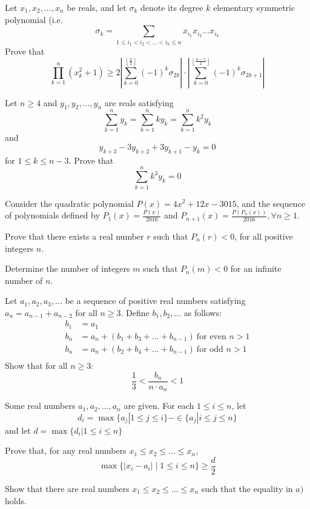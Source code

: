  {Let $x_1,x_2,...,x_n$ be reals, and let $\sigma_k$ denote its degree $k$ elementary symmetric polynomial (i.e. $$\sigma_k=\sum_{1\le i_1<i_2<...<i_k\le n} x_{i_1}x_{i_2}...x_{i_k}$$
Prove that $$\prod_{k=1}^n (x_k^2+1) \ge 2\left\lvert \sum_{k=0}^{\left\lfloor \frac{n}{2}\right\rfloor} (-1)^k\sigma_{2k} \right\rvert\cdot \left\lvert \sum_{k=0}^{\left\lfloor \frac{n-1}{2}\right\rfloor} (-1)^k\sigma_{2k+1} \right\rvert$$}



 {Let $n\ge 4$ and $y_1,y_2,...,y_n$ are reals satisfying $$\sum_{k=1}^n y_k=\sum_{k=1}^n ky_k = \sum_{k=1}^n k^2y_k$$ and $$y_{k+3}-3y_{k+2}+3y_{k+1}-y_k=0$$ for $1\le k\le n-3$. Prove that $$\sum_{k=1}^n k^3y_k=0$$}

 {Consider the quadratic polynomial $P(x) = 4x^2 + 12x - 3015$, and the sequence of polynomials defined by $P_1(x) = \frac{P(x)}{2016}$ and $P_{n+1}(x) = \frac{P(P_n(x))}{2016}, \forall n \ge 1$.
\bi
    \item[a)] Prove that there exists a real number $r$ such that $P_n(r) < 0$, for all positive integers $n$.
    \item[b)] Determine the number of integers $m$ such that $P_n(m) < 0$ for an infinite number of $n$.
\ei}

 {Let $a_1,a_2,a_3,...$ be a sequence of positive real numbers satisfying $a_n=a_{n-1}+a_{n-2}$ for all $n\ge 3$. Define $b_1,b_2,...$ as follows:
    \begin{align*}
    b_1 &= a_1\\
    b_n &= a_n + (b_1+b_3+...+b_{n-1})\ \text{for even }n>1\\
    b_n &= a_n + (b_2+b_4+...+b_{n-1})\ \text{for odd }n>1\\
    \end{align*}
    Show that for all $n\ge 3$: 
    $$\frac{1}{3}<\frac{b_n}{n\cdot a_n}<1$$}



 {Some real numbers $a_1, a_2,..., a_n$ are given. For each $1 \le i \le n$, let
\[d_i = \max\{a_j | 1 \le j \le i \} - \in\{a_j | i \le j \le n \}\]
and let $d = \max\{d_i | 1 \le i \le n \}$
\bi
    \item[a)] Prove that, for any real numbers $x_1 \le x_2 \le ... \le x_n$,
    \[\max\{|x_i-a_i|\mid1\le i \le n\} \ge \frac d2\]
    \item[b)] Show that there are real numbers $x_1 \le x_2 \le ... \le x_n$ such that the equality in $a)$ holds.
\ei}


